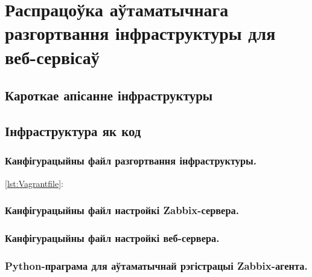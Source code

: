 \section{Распрацоўка аўтаматычнага разгортвання інфраструктуры для веб-сервісаў}

\subsection{Кароткае апісанне інфраструктуры}

\subsection{Інфраструктура як код}

\subsubsection{Канфігурацыйны файл разгортвання інфраструктуры.}
\ref{lst:Vagrantfile}:



\subsubsection{Канфігурацыйны файл настройкі Zabbix-сервера.}

\subsubsection{Канфігурацыйны файл настройкі веб-сервера.}

\subsubsection{Python-праграма для аўтаматычнай рэгістрацыі Zabbix-агента.}
